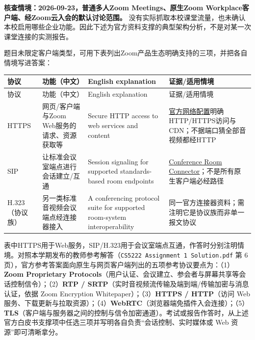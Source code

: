 \textbf{核查情境：2026-09-23，普通多人Zoom Meetings、原生Zoom Workplace客户端、经Zoom云入会的默认讨论范围。} 没有实际抓取本校课堂流量，也未确认本校启用哪些企业功能。因此下述为官方资料支撑的典型架构分析，不是对某一次课堂连接的实测报告。





题目未限定客户端类型，可用下表列出Zoom产品生态明确支持的三项，并把各自情境写进答案：


\begingroup
\small\setlength{\tabcolsep}{3pt}
\renewcommand{\arraystretch}{1.22}
\begin{longtable}{@{}>{\raggedright\arraybackslash}p{}>{\raggedright\arraybackslash}p{}>{\raggedright\arraybackslash}p{}>{\raggedright\arraybackslash}p{}@{}}
\toprule
协议 & 功能（中文） & English explanation & 证据/适用情境 \\
\midrule\endfirsthead
协议 & 功能（中文） & English explanation & 证据/适用情境 \\
\midrule\endhead
\bottomrule\endfoot
HTTPS & 网页/客户端与Zoom Web服务的请求、资源获取等 & Secure HTTP access to web services and content & \href{https://support.zoom.com/hc/en/article?id=zm\_kb\&sysparm\_article=KB0060548}{官方网络配置}明确HTTP/HTTPS访问与CDN；不据端口猜全部音视频都经HTTP \\
SIP & 让标准会议室端点进行会话建立/互通 & Session signaling for supported standards-based room endpoints & \href{https://support.zoom.com/hc/en/article?id=zm\_kb\&sysparm\_article=KB0060661}{Conference Room Connector}；不是所有原生客户端必经路径 \\
H.323（协议族） & 另一类标准音视频会议端点经连接器接入 & A conferencing protocol suite for supported room-system interoperability & 同一官方连接器资料；需注明它是协议族而非单一报文协议 \\
\end{longtable}
\endgroup


表中HTTPS用于Web服务，SIP/H.323用于会议室端点互通，作答时分别注明情境。对照本学期发布的教师参考解答（\texttt{CS5222 Assignment 1 Solution.pdf} 第 6 页），官方参考答案面向原生与网页客户端列出的五项参考协议要点为：（1）\textbf{Zoom Proprietary Protocols}（用户认证、会议建立、参会者与屏幕共享等会话控制信令）；（2）\textbf{RTP / SRTP}（实时音视频流传输及端到端/传输加密与消息认证，依据 Zoom Encryption Whitepaper）；（3）\textbf{HTTPS / HTTP}（访问 Web 服务、下载更新与拉取资源）；（4）\textbf{WebRTC}（浏览器端免插件入会连接）；（5）\textbf{TLS}（客户端与服务器之间的控制与信令加密通道）。考试或报告作答时，从上述官方白皮书支撑项中任选三项并写明各自负责“会话控制、实时媒体或 Web 资源”即可清晰拿分。



